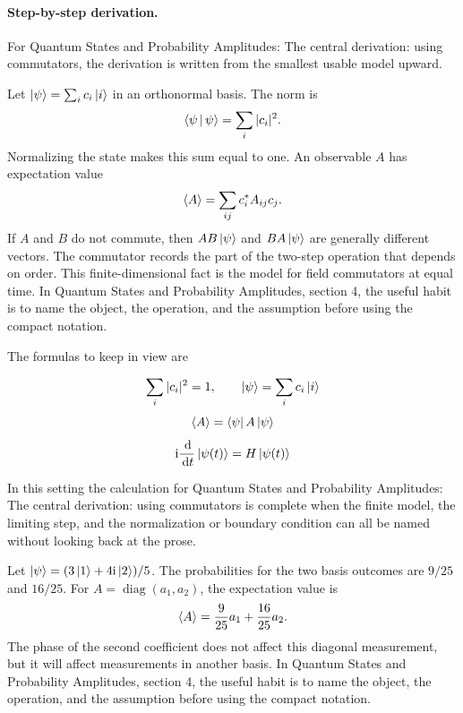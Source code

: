\paragraph{Step-by-step derivation.}

For Quantum States and Probability Amplitudes: The central derivation: using commutators, the derivation is written from the smallest usable model upward.

Let \(\left|\psi\right\rangle=\sum_i c_i\left|i\right\rangle\) in an orthonormal basis.  The norm is
\[
  \left\langle \psi\,\middle|\,\psi\right\rangle=\sum_i |c_i|^2.
\]
Normalizing the state makes this sum equal to one.  An observable \(A\) has expectation value
\[
  \left\langle A\right\rangle=\sum_{ij}c_i^*A_{ij}c_j.
\]
If \(A\) and \(B\) do not commute, then \(AB\left|\psi\right\rangle\) and \(BA\left|\psi\right\rangle\) are generally different vectors.  The commutator records the part of the two-step operation that depends on order.  This finite-dimensional fact is the model for field commutators at equal time.  In Quantum States and Probability Amplitudes, section 4, the useful habit is to name the object, the operation, and the assumption before using the compact notation.

The formulas to keep in view are

\[
  \sum_i |c_i|^2=1,\qquad \left|\psi\right\rangle=\sum_i c_i\left|i\right\rangle
\]
\[
  \left\langle A\right\rangle=\left\langle \psi\right|A\left|\psi\right\rangle
\]
\[
  \mathrm i\frac{\,\mathrm d}{\,\mathrm d t}\left|\psi(t)\right\rangle=H\left|\psi(t)\right\rangle
\]

In this setting the calculation for Quantum States and Probability Amplitudes: The central derivation: using commutators is complete when the finite model, the limiting step, and the normalization or boundary condition can all be named without looking back at the prose.




\begin{example}
Let \(\left|\psi\right\rangle=(3\left|1\right\rangle+4\mathrm i\left|2\right\rangle)/5\).  The probabilities for the two basis outcomes are \(9/25\) and \(16/25\).  For \(A=\operatorname{diag}(a_1,a_2)\), the expectation value is
\[
  \left\langle A\right\rangle=\frac{9}{25}a_1+\frac{16}{25}a_2.
\]
The phase of the second coefficient does not affect this diagonal measurement, but it will affect measurements in another basis.  In Quantum States and Probability Amplitudes, section 4, the useful habit is to name the object, the operation, and the assumption before using the compact notation.
\end{example}



